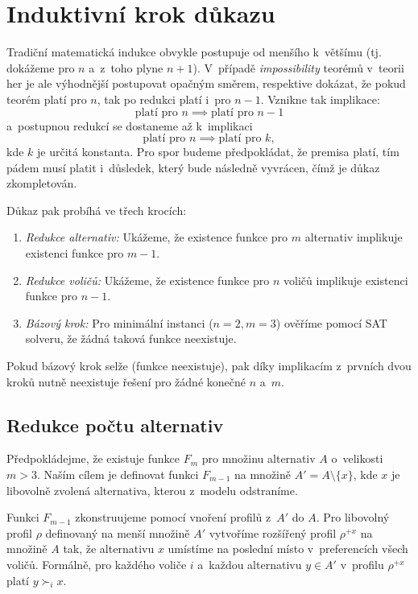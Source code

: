 \documentclass[a4paper, 11pt]{article}
\begin{document}
\section{Induktivní krok důkazu}

Tradiční matematická indukce obvykle postupuje od menšího k~většímu (tj. dokážeme pro $n$ a~z~toho plyne $n+1$).
V~případě \emph{impossibility} teorémů v~teorii her je ale výhodnější postupovat opačným směrem, respektive dokázat, že pokud teorém platí pro $n$, tak po redukci platí i~pro $n-1$.
Vznikne tak implikace:
\[
    \text{platí pro } n \implies \text{platí pro } n-1
\]
a~postupnou redukcí se dostaneme až k~implikaci
\[
    \text{platí pro } n \implies \text{platí pro } k,
\]
kde $k$ je určitá konstanta.
Pro spor budeme předpokládat, že premisa platí, tím pádem musí platit i~důsledek, který bude následně vyvrácen, čímž je důkaz zkompletován.

Důkaz pak probíhá ve třech krocích:
\begin{enumerate}
    \item \emph{Redukce alternativ:} Ukážeme, že existence funkce pro $m$ alternativ implikuje existenci funkce pro $m-1$.
    \item \emph{Redukce voličů:} Ukážeme, že existence funkce pro $n$ voličů implikuje existenci funkce pro $n-1$.
    \item \emph{Bázový krok:} Pro minimální instanci ($n=2, m=3$) ověříme pomocí SAT solveru, že žádná taková funkce neexistuje.
\end{enumerate}
Pokud bázový krok selže (funkce neexistuje), pak díky implikacím z~prvních dvou kroků nutně neexistuje řešení pro žádné konečné $n$ a~$m$.

\subsection{Redukce počtu alternativ}

Předpokládejme, že existuje funkce $F_m$ pro množinu alternativ $A$ o~velikosti $m > 3$.
Naším cílem je definovat funkci $F_{m-1}$ na množině $A' = A \setminus \{x\}$, kde $x$ je libovolně zvolená alternativa, kterou z~modelu odstraníme.

Funkci $F_{m-1}$ zkonstruujeme pomocí vnoření profilů z~$A'$ do $A$.
Pro libovolný profil $\rho$ definovaný na menší množině $A'$ vytvoříme rozšířený profil $\rho^{+x}$ na množině $A$ tak, že alternativu $x$ umístíme na poslední místo v~preferencích všech voličů.
Formálně, pro každého voliče $i$ a~každou alternativu $y \in A'$ v~profilu $\rho^{+x}$ platí $y \succ_i x$.
\end{document}
